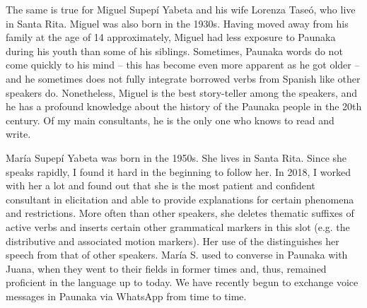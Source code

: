 The same is true for Miguel Supepí Yabeta and his wife Lorenza Taseó, who live in Santa Rita. Miguel was also born in the 1930s. Having moved away from his family at the age of 14 approximately, Miguel had less exposure to Paunaka during his youth than some of his siblings. Sometimes, Paunaka words do not come quickly to his mind – this has become even more apparent as he got older – and he sometimes does not fully integrate borrowed verbs from Spanish like other speakers do. Nonetheless, Miguel is the best story-teller among the speakers, and he has a profound knowledge about the history of the Paunaka people in the 20th century. Of my main consultants, he is the only one who knows to read and write.

María Supepí Yabeta was born in the 1950s. She lives in Santa Rita. Since she speaks rapidly, I found it hard in the beginning to follow her. In 2018, I worked with her a lot and found out that she is the most patient and confident consultant in elicitation and able to provide explanations for certain phenomena and restrictions. More often than other speakers, she deletes thematic suffixes of active verbs and inserts certain other grammatical markers in this slot (e.g. the distributive and associated motion markers). Her use of the  distinguishes her speech from that of other speakers. María S. used to converse in Paunaka with Juana, when they went to their fields in former times and, thus, remained proficient in the language up to today. We have recently begun to exchange voice messages in Paunaka via WhatsApp from time to time.

